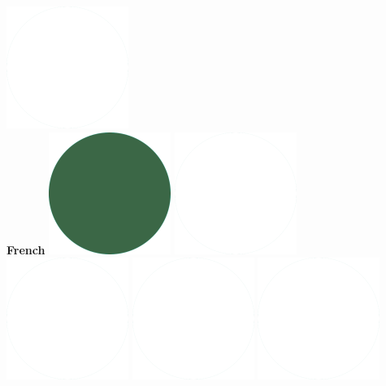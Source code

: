 \documentclass[]{friggeri-cv_reccius-experiment}
\begin{document}
\begin{below1}
    \includegraphics[scale=0.11]{img/WhiteDots.png}\\
    \belowspace
    \textbf{French}\hfill
    \includegraphics[scale=0.11]{img/IPSGreenDots.png}
    \includegraphics[scale=0.11]{img/WhiteDots.png}
    \includegraphics[scale=0.11]{img/WhiteDots.png}
    \includegraphics[scale=0.11]{img/WhiteDots.png}
    \includegraphics[scale=0.11]{img/WhiteDots.png}

\end{below1}
\end{document}
